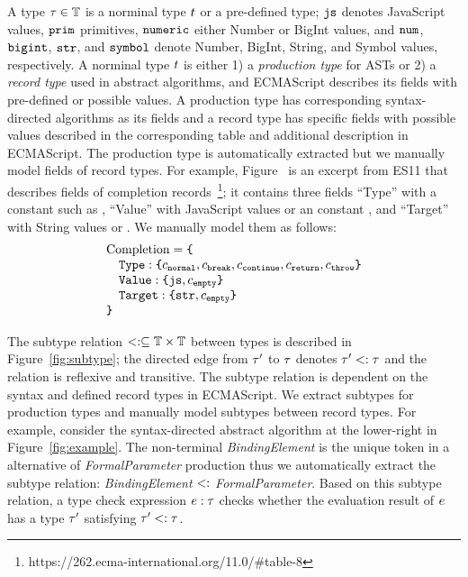 A type $\tau \in \mathbb{T}$ is a norminal type $t$ or a pre-defined type;
$\texttt{js}$ denotes JavaScript values, $\texttt{prim}$ primitives, $\texttt{numeric}$ either Number
or BigInt values, and $\texttt{num}$, $\texttt{bigint}$, $\texttt{str}$, and $\texttt{symbol}$ denote Number,
BigInt, String, and Symbol values, respectively.  A norminal type $t$ is
either 1) a \textit{production type} for ASTs or 2) a \textit{record type} used
in abstract algorithms, and ECMAScript describes its fields with pre-defined or
possible values.  A production type has corresponding syntax-directed algorithms
as its fields and a record type has specific fields with possible values
described in the corresponding table and additional description in ECMAScript.
The production type is automatically extracted but we manually model fields of
record types.  For example, Figure~\label{fig:record-fields-table} is an excerpt
from ES11 that describes fields of completion
records~\footnote{https://262.ecma-international.org/11.0/\#table-8}; it
contains three fields ``Type'' with a constant such as , ``Value''
with JavaScript values or an constant , and ``Target'' with String
values or .  We manually model them as follows:
\small
\[
  \begin{array}{l}
    \text{Completion} = \texttt{\{}\\
    \quad \texttt{Type}: \texttt{\{} c_{\texttt{normal}}, c_{\texttt{break}}, c_{\texttt{continue}},
    c_{\texttt{return}}, c_{\texttt{throw}} \texttt{\}}\\
    \quad \texttt{Value}: \texttt{\{} \texttt{js}, c_{\texttt{empty}} \texttt{\}}\\
    \quad \texttt{Target}: \texttt{\{} \texttt{str}, c_{\texttt{empty}} \texttt{\}}\\
    \texttt{\}}\\
  \end{array}
\]

The subtype relation $<: \subseteq \mathbb{T} \times \mathbb{T}$ between types is
described in Figure~\ref{fig:subtype}; the directed edge from $\tau'$ to $\tau$
denotes $\tau' <: \tau$ and the relation is reflexive and transitive.  The
subtype relation is dependent on the syntax and defined record types in
ECMAScript.  We extract subtypes for production types and manually model
subtypes between record types.  For example, consider the syntax-directed
abstract algorithm at the lower-right in Figure~\ref{fig:example}.  The
non-terminal \textit{BindingElement} is the unique token in a alternative of
\textit{FormalParameter} production thus we automatically extract the subtype
relation: \textit{BindingElement} $<:$ \textit{FormalParameter}.  Based on
this subtype relation, a type check expression $e: \tau$ checks whether the
evaluation result of $e$ has a type $\tau'$ satisfying $\tau' <: \tau$.

